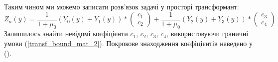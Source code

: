 Таким чином ми можемо записати розв'язок задачі у просторі трансформант:
\begin{equation}
    Z_n(y) = \frac{1}{1 + \mu_0} \left( Y_0(y) +  Y_1(y)  \right) * \begin{pmatrix} c_1 \\ c_2 \end{pmatrix} +  \frac{1}{1 + \mu_0} \left( Y_2(y) +  Y_3(y) \right) * \begin{pmatrix} c_3 \\ c_4 \end{pmatrix}
\end{equation}
Залишилось знайти невідомі коєфіцієнти $c_1$, $c_2$, $c_3$, $c_4$, використовуючи граничні умови (\ref{transf_bound_mat_2}).
Покрокове знаходження коєфіцієнтів наведено у ().
